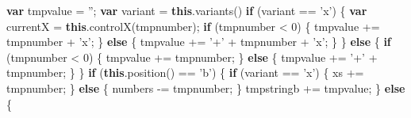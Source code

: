 \documentclass[
]{article}
\newenvironment{Shaded}{}{}
\newcommand{\AttributeTok}[1]{\textcolor[rgb]{0.49,0.56,0.16}{#1}}
\newcommand{\ControlFlowTok}[1]{\textcolor[rgb]{0.00,0.44,0.13}{\textbf{#1}}}
\newcommand{\DecValTok}[1]{\textcolor[rgb]{0.25,0.63,0.44}{#1}}
\newcommand{\KeywordTok}[1]{\textcolor[rgb]{0.00,0.44,0.13}{\textbf{#1}}}
\newcommand{\NormalTok}[1]{#1}
\newcommand{\OperatorTok}[1]{\textcolor[rgb]{0.40,0.40,0.40}{#1}}
\newcommand{\StringTok}[1]{\textcolor[rgb]{0.25,0.44,0.63}{#1}}
\begin{document}
\begin{Shaded}
\begin{Highlighting}[]
                        \KeywordTok{var}\NormalTok{ tmpvalue }\OperatorTok{=} \StringTok{''}\OperatorTok{;}
                        \KeywordTok{var}\NormalTok{ variant }\OperatorTok{=} \KeywordTok{this}\NormalTok{.}\AttributeTok{variants}\NormalTok{()}
                        \ControlFlowTok{if}\NormalTok{ (variant }\OperatorTok{==} \StringTok{'x'}\NormalTok{) }\OperatorTok{\{}
                            \KeywordTok{var}\NormalTok{ currentX }\OperatorTok{=} \KeywordTok{this}\NormalTok{.}\AttributeTok{controlX}\NormalTok{(tmpnumber)}\OperatorTok{;}
                            \ControlFlowTok{if}\NormalTok{ (tmpnumber }\OperatorTok{<} \DecValTok{0}\NormalTok{) }\OperatorTok{\{}
\NormalTok{                                tmpvalue }\OperatorTok{+=}\NormalTok{ tmpnumber }\OperatorTok{+} \StringTok{'x'}\OperatorTok{;}
                            \OperatorTok{\}} \ControlFlowTok{else} \OperatorTok{\{}
\NormalTok{                                tmpvalue }\OperatorTok{+=} \StringTok{'+'} \OperatorTok{+}\NormalTok{ tmpnumber }\OperatorTok{+} \StringTok{'x'}\OperatorTok{;}
                            \OperatorTok{\}}
                        \OperatorTok{\}} \ControlFlowTok{else} \OperatorTok{\{}
                            \ControlFlowTok{if}\NormalTok{ (tmpnumber }\OperatorTok{<} \DecValTok{0}\NormalTok{) }\OperatorTok{\{}
\NormalTok{                                tmpvalue }\OperatorTok{+=}\NormalTok{ tmpnumber}\OperatorTok{;}
                            \OperatorTok{\}} \ControlFlowTok{else} \OperatorTok{\{}
\NormalTok{                                tmpvalue }\OperatorTok{+=} \StringTok{'+'} \OperatorTok{+}\NormalTok{ tmpnumber}\OperatorTok{;}
                            \OperatorTok{\}}                       
                        \OperatorTok{\}}
                        \ControlFlowTok{if}\NormalTok{ (}\KeywordTok{this}\NormalTok{.}\AttributeTok{position}\NormalTok{() }\OperatorTok{==} \StringTok{'b'}\NormalTok{) }\OperatorTok{\{}
                            \ControlFlowTok{if}\NormalTok{ (variant }\OperatorTok{==} \StringTok{'x'}\NormalTok{) }\OperatorTok{\{}
\NormalTok{                                xs }\OperatorTok{+=}\NormalTok{ tmpnumber}\OperatorTok{;}
                            \OperatorTok{\}} \ControlFlowTok{else} \OperatorTok{\{}
\NormalTok{                                numbers }\OperatorTok{-=}\NormalTok{ tmpnumber}\OperatorTok{;}
                            \OperatorTok{\}}
\NormalTok{                            tmpstringb }\OperatorTok{+=}\NormalTok{ tmpvalue}\OperatorTok{;}
                        \OperatorTok{\}} \ControlFlowTok{else} \OperatorTok{\{}

\end{Highlighting}
\end{Shaded}
\end{document}
